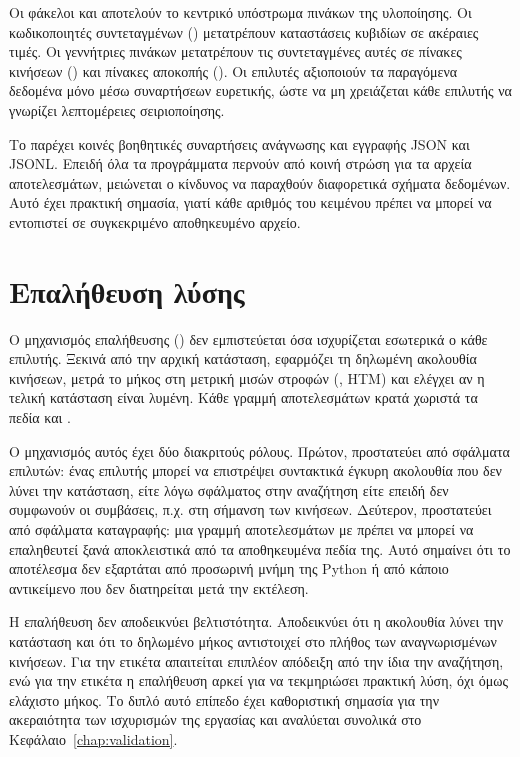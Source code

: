 Οι φάκελοι  και  αποτελούν το κεντρικό υπόστρωμα πινάκων της υλοποίησης. Οι κωδικοποιητές συντεταγμένων () μετατρέπουν καταστάσεις κυβιδίων σε ακέραιες τιμές. Οι γεννήτριες πινάκων μετατρέπουν τις συντεταγμένες αυτές σε πίνακες κινήσεων () και πίνακες αποκοπής (). Οι επιλυτές αξιοποιούν τα παραγόμενα δεδομένα μόνο μέσω συναρτήσεων ευρετικής, ώστε να μη χρειάζεται κάθε επιλυτής να γνωρίζει λεπτομέρειες σειριοποίησης.

Το  παρέχει κοινές βοηθητικές συναρτήσεις ανάγνωσης και εγγραφής JSON και JSONL. Επειδή όλα τα προγράμματα περνούν από κοινή στρώση για τα αρχεία αποτελεσμάτων, μειώνεται ο κίνδυνος να παραχθούν διαφορετικά σχήματα δεδομένων. Αυτό έχει πρακτική σημασία, γιατί κάθε αριθμός του κειμένου πρέπει να μπορεί να εντοπιστεί σε συγκεκριμένο αποθηκευμένο αρχείο.

\section{Επαλήθευση λύσης}
\label{sec:implementation-verifier}
Ο μηχανισμός επαλήθευσης () δεν εμπιστεύεται όσα ισχυρίζεται εσωτερικά ο κάθε επιλυτής. Ξεκινά από την αρχική κατάσταση, εφαρμόζει τη δηλωμένη ακολουθία κινήσεων, μετρά το μήκος στη μετρική μισών στροφών (, HTM) και ελέγχει αν η τελική κατάσταση είναι λυμένη. Κάθε γραμμή αποτελεσμάτων κρατά χωριστά τα πεδία  και .

Ο μηχανισμός αυτός έχει δύο διακριτούς ρόλους. Πρώτον, προστατεύει από σφάλματα επιλυτών: ένας επιλυτής μπορεί να επιστρέψει συντακτικά έγκυρη ακολουθία που δεν λύνει την κατάσταση, είτε λόγω σφάλματος στην αναζήτηση είτε επειδή δεν συμφωνούν οι συμβάσεις, π.χ. στη σήμανση των κινήσεων. Δεύτερον, προστατεύει από σφάλματα καταγραφής: μια γραμμή αποτελεσμάτων με  πρέπει να μπορεί να επαληθευτεί ξανά αποκλειστικά από τα αποθηκευμένα πεδία της. Αυτό σημαίνει ότι το αποτέλεσμα δεν εξαρτάται από προσωρινή μνήμη της Python ή από κάποιο αντικείμενο που δεν διατηρείται μετά την εκτέλεση.

Η επαλήθευση δεν αποδεικνύει βελτιστότητα. Αποδεικνύει ότι η ακολουθία λύνει την κατάσταση και ότι το δηλωμένο μήκος αντιστοιχεί στο πλήθος των αναγνωρισμένων κινήσεων. Για την ετικέτα  απαιτείται επιπλέον απόδειξη από την ίδια την αναζήτηση, ενώ για την ετικέτα  η επαλήθευση αρκεί για να τεκμηριώσει πρακτική λύση, όχι όμως ελάχιστο μήκος. Το διπλό αυτό επίπεδο έχει καθοριστική σημασία για την ακεραιότητα των ισχυρισμών της εργασίας και αναλύεται συνολικά στο Κεφάλαιο~\ref{chap:validation}.

